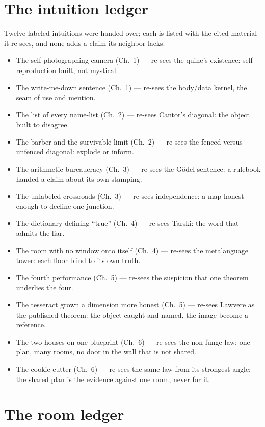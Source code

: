 \section*{The intuition ledger}

Twelve labeled intuitions were handed over; each is listed with the cited
material it re-sees, and none adds a claim its neighbor lacks.

\begin{itemize}
\item[I1.] The self-photographing camera (Ch.~1) --- re-sees the quine's
existence: self-reproduction built, not mystical.
\item[I2.] The write-me-down sentence (Ch.~1) --- re-sees the body/data
kernel, the seam of use and mention.
\item[I3.] The list of every name-list (Ch.~2) --- re-sees Cantor's
diagonal: the object built to disagree.
\item[I4.] The barber and the survivable limit (Ch.~2) --- re-sees the
fenced-versus-unfenced diagonal: explode or inform.
\item[I5.] The arithmetic bureaucracy (Ch.~3) --- re-sees the G\"odel
sentence: a rulebook handed a claim about its own stamping.
\item[I6.] The unlabeled crossroads (Ch.~3) --- re-sees independence: a
map honest enough to decline one junction.
\item[I7.] The dictionary defining ``true'' (Ch.~4) --- re-sees Tarski:
the word that admits the liar.
\item[I8.] The room with no window onto itself (Ch.~4) --- re-sees the
metalanguage tower: each floor blind to its own truth.
\item[I9.] The fourth performance (Ch.~5) --- re-sees the suspicion that
one theorem underlies the four.
\item[I10.] The tesseract grown a dimension more honest (Ch.~5) ---
re-sees Lawvere as the published theorem: the object caught and named,
the image become a reference.
\item[I11.] The two houses on one blueprint (Ch.~6) --- re-sees the
non-funge law: one plan, many rooms, no door in the wall that is not
shared.
\item[I12.] The cookie cutter (Ch.~6) --- re-sees the same law from its
strongest angle: the shared plan is the evidence against one room, never
for it.
\end{itemize}

\section*{The room ledger}

